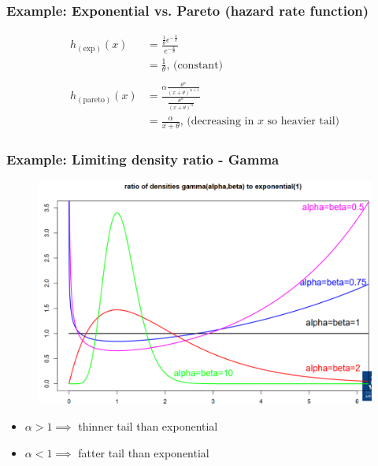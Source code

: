 \documentclass[11pt]{article}
\begin{document}
\subsubsection*{Example: Exponential vs. Pareto (hazard rate function)}
\begin{align*}
    h_{(\text{exp})}(x) &= \frac{\frac{1}{\theta}e^{-\frac{x}{\theta}}}{e^{-\frac{x}{\theta}}} \\
    &= \frac{1}{\theta} \text{, (constant)} \\
    &\quad \\
    h_{(\text{pareto})}(x) &= \frac{\alpha \frac{\theta^\alpha}{(x+\theta)^{\alpha+1}}}{\frac{\theta^\alpha}{(x+\theta)^\alpha}} \\
    &= \frac{\alpha}{x+\theta} \text{, (decreasing in $x$ so heavier tail)}
\end{align*}

\subsubsection*{Example: Limiting density ratio - Gamma}
\begin{figure}[H]
    \centering
    \includegraphics[width=0.7\linewidth]{Limiting density ratio - gamma example.png}
\end{figure}
\begin{itemize}
    \item $\alpha > 1 \implies$ thinner tail than exponential
    \item $\alpha < 1 \implies$ fatter tail than exponential
\end{itemize}
\end{document}
